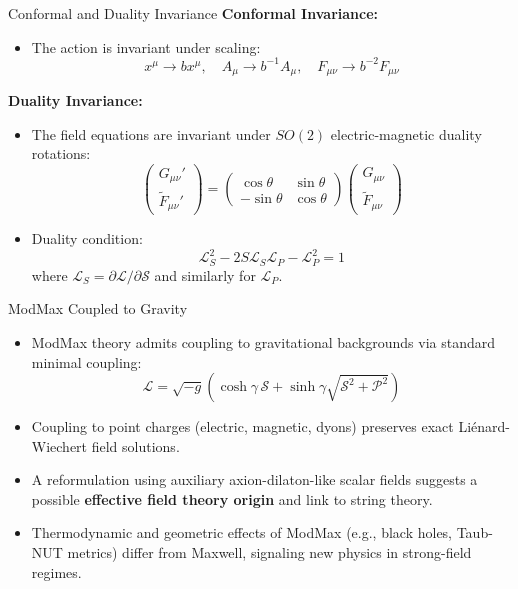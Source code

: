\begin{frame}[allowframebreaks]{Conformal and Duality Invariance}
  \textbf{Conformal Invariance:}
  \begin{itemize}
    \item The action is invariant under scaling:
    \[
    x^\mu \to b x^\mu, \quad A_\mu \to b^{-1} A_\mu, \quad F_{\mu\nu} \to b^{-2} F_{\mu\nu}
    \]
  \end{itemize}
  \textbf{Duality Invariance:}
  \begin{itemize}
    \item The field equations are invariant under $SO(2)$ electric-magnetic duality rotations:
    \[
    \begin{pmatrix}
      G_{\mu\nu}' \\
      \widetilde{F}_{\mu\nu}'
    \end{pmatrix}
    =
    \begin{pmatrix}
      \cos\theta & \sin\theta \\
      -\sin\theta & \cos\theta
    \end{pmatrix}
    \begin{pmatrix}
      G_{\mu\nu} \\
      \widetilde{F}_{\mu\nu}
    \end{pmatrix}
    \]
    \item Duality condition:
    \[
    \mathcal{L}_S^2 - 2S \mathcal{L}_S \mathcal{L}_P - \mathcal{L}_P^2 = 1
    \]
    where $\mathcal{L}_S = \partial \mathcal{L}/\partial \mathcal{S}$ and similarly for $\mathcal{L}_P$.
  \end{itemize}
\end{frame}

\begin{frame}[allowframebreaks]{ModMax Coupled to Gravity}
  \begin{itemize}
    \item ModMax theory admits coupling to gravitational backgrounds via standard minimal coupling:
    \[
    \mathcal{L} = \sqrt{-g} \left( \cosh\gamma \, \mathcal{S} + \sinh\gamma \sqrt{\mathcal{S}^2 + \mathcal{P}^2} \right)
    \]
    \item Coupling to point charges (electric, magnetic, dyons) preserves exact Liénard-Wiechert field solutions.
    \item A reformulation using auxiliary axion-dilaton-like scalar fields suggests a possible \textbf{effective field theory origin} and link to string theory.
    \item Thermodynamic and geometric effects of ModMax (e.g., black holes, Taub-NUT metrics) differ from Maxwell, signaling new physics in strong-field regimes.
  \end{itemize}
\end{frame}

